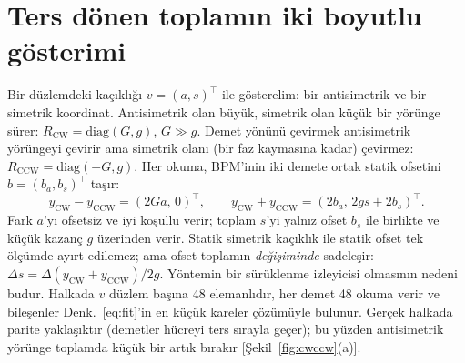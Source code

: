 \documentclass[11pt,a4paper]{article}
\begin{document}
\section{Ters dönen toplamın iki boyutlu gösterimi}\label{ek:oyuncak}
Bir düzlemdeki kaçıklığı $v=(a,s)^\top$ ile gösterelim: bir antisimetrik ve bir simetrik koordinat. Antisimetrik
olan büyük, simetrik olan küçük bir yörünge sürer: $R_\text{CW}=\mathrm{diag}(G,g)$, $G\gg g$. Demet yönünü
çevirmek antisimetrik yörüngeyi çevirir ama simetrik olanı (bir faz kaymasına kadar) çevirmez:
$R_\text{CCW}=\mathrm{diag}(-G,g)$. Her okuma, BPM'inin iki demete ortak statik ofsetini $b=(b_a,b_s)^\top$ taşır:
\begin{equation}
y_\text{CW}-y_\text{CCW}=(2Ga,\,0)^\top,\qquad y_\text{CW}+y_\text{CCW}=(2b_a,\,2gs+2b_s)^\top.
\end{equation}
Fark $a$'yı ofsetsiz ve iyi koşullu verir; toplam $s$'yi yalnız ofset $b_s$ ile birlikte ve küçük kazanç $g$
üzerinden verir. Statik simetrik kaçıklık ile statik ofset tek ölçümde ayırt edilemez; ama ofset toplamın
\emph{değişiminde} sadeleşir: $\Delta s=\Delta(y_\text{CW}+y_\text{CCW})/2g$. Yöntemin bir sürüklenme izleyicisi
olmasının nedeni budur. Halkada $v$ düzlem başına 48 elemanlıdır, her demet 48 okuma verir ve bileşenler
Denk.~\eqref{eq:fit}'in en küçük kareler çözümüyle bulunur. Gerçek halkada parite yaklaşıktır (demetler hücreyi
ters sırayla geçer); bu yüzden antisimetrik yörünge toplamda küçük bir artık bırakır [Şekil~\ref{fig:cwccw}(a)].
\end{document}
